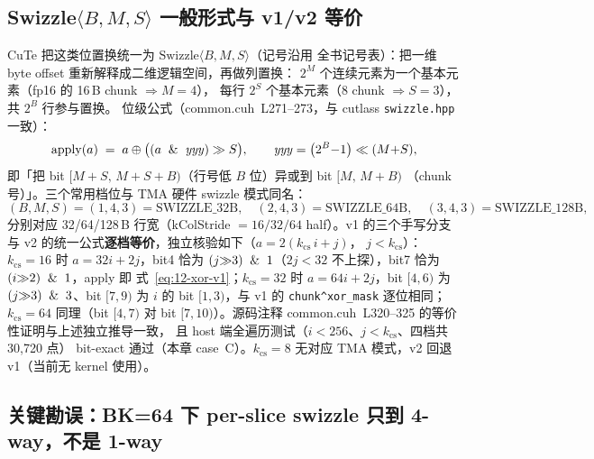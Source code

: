 \subsection{Swizzle$\langle B,M,S\rangle$ 一般形式与 v1/v2 等价}

CuTe 把这类位置换统一为 $\mathrm{Swizzle}\langle B,M,S\rangle$（记号沿用
全书记号表）：把一维 byte offset 重新解释成二维逻辑空间，再做列置换：
$2^M$ 个连续元素为一个基本元素（fp16 的 16\,B chunk $\Rightarrow M{=}4$），
每行 $2^S$ 个基本元素（8 chunk $\Rightarrow S{=}3$），共 $2^B$ 行参与置换。
位级公式（common.cuh~L271--273，与 cutlass \texttt{swizzle.hpp} 一致）：
\begin{equation}
  \mathrm{apply}(a) \;=\; a \oplus \bigl((a \And \mathit{yyy}) \gg S\bigr),
  \qquad \mathit{yyy} = \bigl(2^B{-}1\bigr)\ll (M{+}S) ,
  \label{eq:12-apply}
\end{equation}
即「把 bit $[M{+}S,\,M{+}S{+}B)$（行号低 $B$ 位）异或到 bit $[M,\,M{+}B)$
（chunk 号）」。三个常用档位与 TMA 硬件 swizzle 模式同名：
\begin{equation}
  (B,M,S)=(1,4,3)=\text{SWIZZLE\_32B},\quad
  (2,4,3)=\text{SWIZZLE\_64B},\quad
  (3,4,3)=\text{SWIZZLE\_128B},
\end{equation}
分别对应 32/64/128\,B 行宽（kColStride $=16/32/64$ half）。v1 的三个手写分支与
v2 的统一公式\textbf{逐档等价}，独立核验如下（$a=2(k_{\mathrm{cs}}\,i+j)$，
$j<k_{\mathrm{cs}}$）：$k_{\mathrm{cs}}{=}16$ 时 $a=32i+2j$，bit4 恰为
$(j{\gg}3)\And1$（$2j<32$ 不上探），bit7 恰为 $(i{\gg}2)\And1$，apply 即
式~\ref{eq:12-xor-v1}；$k_{\mathrm{cs}}{=}32$ 时 $a=64i+2j$，bit $[4,6)$ 为
$(j{\gg}3)\And3$、bit $[7,9)$ 为 $i$ 的 bit $[1,3)$，与 v1 的
\texttt{chunk\^{}xor\_\allowbreak{}mask} 逐位相同；$k_{\mathrm{cs}}{=}64$ 同理（bit $[4,7)$
对 bit $[7,10)$）。源码注释 common.cuh~L320--325 的等价性证明与上述独立推导一致，
且 host 端全遍历测试（$i<256$、$j<k_{\mathrm{cs}}$、四档共 30{,}720 点）
bit-exact 通过（本章 case~C）。$k_{\mathrm{cs}}{=}8$ 无对应 TMA 模式，v2 回退
v1（当前无 kernel 使用）。

\subsection{关键勘误：BK=64 下 per-slice swizzle 只到 4-way，不是 1-way}

